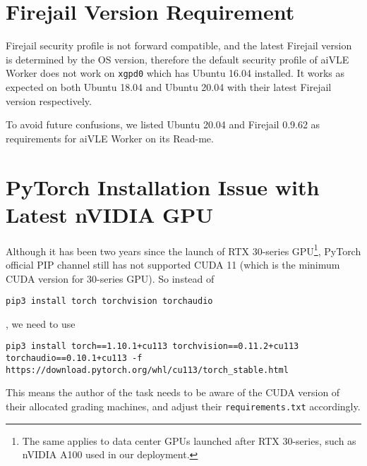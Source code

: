 \section{Firejail Version Requirement}
Firejail security profile is not forward compatible, and the latest Firejail version is determined by the OS version, therefore the default security profile of aiVLE Worker does not work on  \texttt{xgpd0} which has Ubuntu 16.04 installed. It works as expected on both Ubuntu 18.04 and Ubuntu 20.04 with their latest Firejail version respectively.

To avoid future confusions, we listed Ubuntu 20.04 and Firejail 0.9.62 as requirements for aiVLE Worker on its Read-me.

\section{PyTorch Installation Issue with Latest nVIDIA GPU}
Although it has been two years since the launch of RTX 30-series GPU\footnote{The same applies to data center GPUs launched after RTX 30-series, such as nVIDIA A100 used in our deployment.}, PyTorch official PIP channel still has not supported CUDA 11 (which is the minimum CUDA version for 30-series GPU). So instead of 
\begin{code}
\begin{verbatim}
pip3 install torch torchvision torchaudio
\end{verbatim}
\end{code}
, we need to use
\begin{code}
\begin{verbatim}
pip3 install torch==1.10.1+cu113 torchvision==0.11.2+cu113 torchaudio==0.10.1+cu113 -f https://download.pytorch.org/whl/cu113/torch_stable.html
\end{verbatim}
\end{code}

This means the author of the task needs to be aware of the CUDA version of their allocated grading machines, and adjust their \texttt{requirements.txt} accordingly.